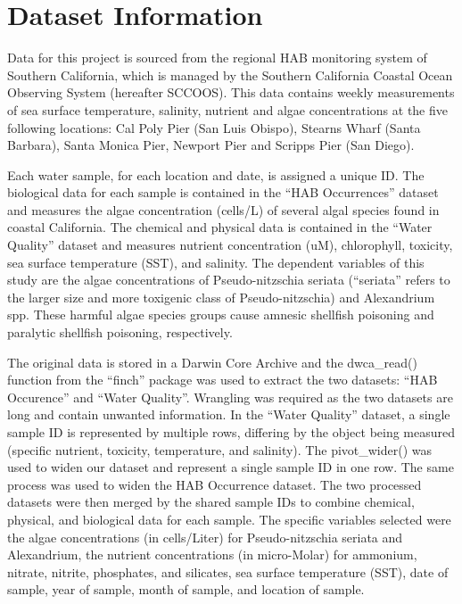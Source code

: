 \documentclass[
  12pt,
]{article}
\begin{document}
\newpage

\hypertarget{dataset-information}{%
\section{Dataset Information}\label{dataset-information}}

Data for this project is sourced from the regional HAB monitoring system
of Southern California, which is managed by the Southern California
Coastal Ocean Observing System (hereafter SCCOOS). This data contains
weekly measurements of sea surface temperature, salinity, nutrient and
algae concentrations at the five following locations: Cal Poly Pier (San
Luis Obispo), Stearns Wharf (Santa Barbara), Santa Monica Pier, Newport
Pier and Scripps Pier (San Diego).

Each water sample, for each location and date, is assigned a unique ID.
The biological data for each sample is contained in the ``HAB
Occurrences'' dataset and measures the algae concentration (cells/L) of
several algal species found in coastal California. The chemical and
physical data is contained in the ``Water Quality'' dataset and measures
nutrient concentration (uM), chlorophyll, toxicity, sea surface
temperature (SST), and salinity. The dependent variables of this study
are the algae concentrations of Pseudo-nitzschia seriata (``seriata''
refers to the larger size and more toxigenic class of Pseudo-nitzschia)
and Alexandrium spp. These harmful algae species groups cause amnesic
shellfish poisoning and paralytic shellfish poisoning, respectively.

The original data is stored in a Darwin Core Archive and the
dwca\_read() function from the ``finch'' package was used to extract the
two datasets: ``HAB Occurence'' and ``Water Quality''. Wrangling was
required as the two datasets are long and contain unwanted information.
In the ``Water Quality'' dataset, a single sample ID is represented by
multiple rows, differing by the object being measured (specific
nutrient, toxicity, temperature, and salinity). The pivot\_wider() was
used to widen our dataset and represent a single sample ID in one row.
The same process was used to widen the HAB Occurrence dataset. The two
processed datasets were then merged by the shared sample IDs to combine
chemical, physical, and biological data for each sample. The specific
variables selected were the algae concentrations (in cells/Liter) for
Pseudo-nitzschia seriata and Alexandrium, the nutrient concentrations
(in micro-Molar) for ammonium, nitrate, nitrite, phosphates, and
silicates, sea surface temperature (SST), date of sample, year of
sample, month of sample, and location of sample.
\end{document}
